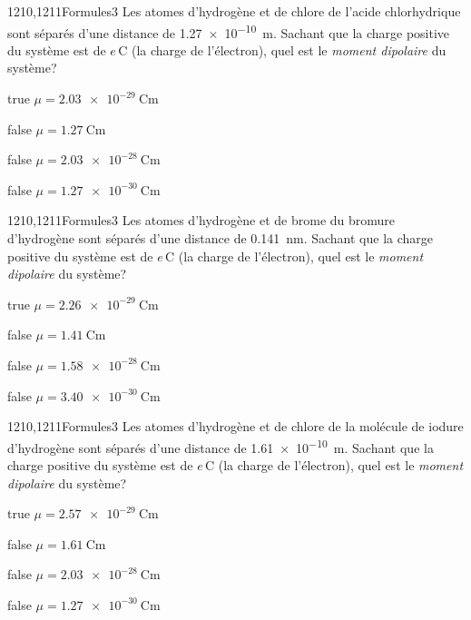         \begin{question}{1210,1211}{Formules}{3}{}
            Les atomes d'hydrogène et de chlore de l'acide chlorhydrique sont séparés d'une distance de \SI{1.27e-10}{\meter}. Sachant que la charge positive du système est de $e\,\si{\coulomb}$ (la charge de l'électron), quel est le \emph{moment dipolaire} du système?
        \end{question}
        \begin{reponses}
    	    \item[true] $\mu = \SI{2.03e-29}{\coulomb\meter}$
    	    \item[false] $\mu = \SI{1.27}{\coulomb\meter}$
    	    \item[false] $\mu = \SI{2.03e-28}{\coulomb\meter}$
    	    \item[false] $\mu = \SI{1.27e-30}{\coulomb\meter}$
        \end{reponses}
        \begin{question}{1210,1211}{Formules}{3}{}
            Les atomes d'hydrogène et de brome du bromure d'hydrogène sont séparés d'une distance de \SI{0.141}{\nano\meter}. Sachant que la charge positive du système est de $e\,\si{\coulomb}$ (la charge de l'électron), quel est le \emph{moment dipolaire} du système?
        \end{question}
        \begin{reponses}
    	    \item[true] $\mu = \SI{2.26e-29}{\coulomb\meter}$
    	    \item[false] $\mu = \SI{1.41}{\coulomb\meter}$
    	    \item[false] $\mu = \SI{1.58e-28}{\coulomb\meter}$
    	    \item[false] $\mu = \SI{3.40e-30}{\coulomb\meter}$
        \end{reponses}
        \begin{question}{1210,1211}{Formules}{3}{}
			Les atomes d'hydrogène et de chlore de la molécule de iodure d'hydrogène sont séparés d'une distance de \SI{1.61e-10}{\meter}. Sachant que la charge positive du système est de $e\,\si{\coulomb}$ (la charge de l'électron), quel est le \emph{moment dipolaire} du système?
        \end{question}
        \begin{reponses}
    	    \item[true] $\mu = \SI{2.57e-29}{\coulomb\meter}$
    	    \item[false] $\mu = \SI{1.61}{\coulomb\meter}$
    	    \item[false] $\mu = \SI{2.03e-28}{\coulomb\meter}$
    	    \item[false] $\mu = \SI{1.27e-30}{\coulomb\meter}$
        \end{reponses}
